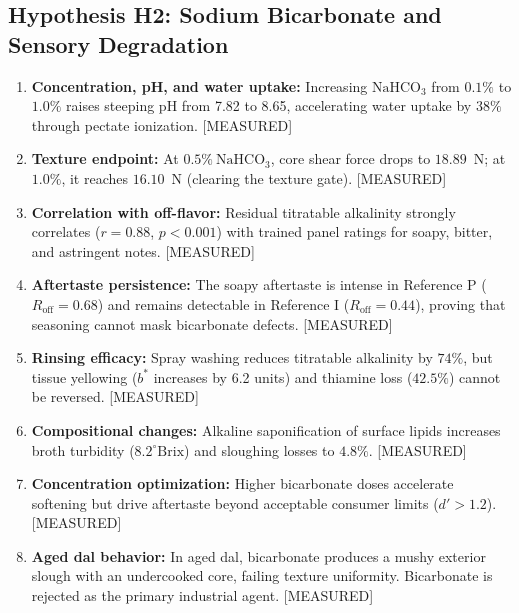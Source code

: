 \documentclass[10pt,a4paper]{article}
\newcommand{\epistag}[1]{\textsf{\scriptsize\textcolor{fnqslate}{[#1]}}}
\begin{document}
\subsection{Hypothesis H2: Sodium Bicarbonate and Sensory Degradation}
\begin{enumerate}[label=\textbf{H2.\arabic*:},leftmargin=1.5cm]
    \item \textbf{Concentration, pH, and water uptake:} Increasing $\mathrm{NaHCO}_3$ from $0.1\%$ to $1.0\%$ raises steeping pH from 7.82 to 8.65, accelerating water uptake by $38\%$ through pectate ionization. \epistag{MEASURED}
    \item \textbf{Texture endpoint:} At $0.5\%\ \mathrm{NaHCO}_3$, core shear force drops to $18.89$~N; at $1.0\%$, it reaches $16.10$~N (clearing the texture gate). \epistag{MEASURED}
    \item \textbf{Correlation with off-flavor:} Residual titratable alkalinity strongly correlates ($r = 0.88$, $p < 0.001$) with trained panel ratings for soapy, bitter, and astringent notes. \epistag{MEASURED}
    \item \textbf{Aftertaste persistence:} The soapy aftertaste is intense in Reference P ($R_{\mathrm{off}} = 0.68$) and remains detectable in Reference I ($R_{\mathrm{off}} = 0.44$), proving that seasoning cannot mask bicarbonate defects. \epistag{MEASURED}
    \item \textbf{Rinsing efficacy:} Spray washing reduces titratable alkalinity by $74\%$, but tissue yellowing ($b^*$ increases by 6.2 units) and thiamine loss ($42.5\%$) cannot be reversed. \epistag{MEASURED}
    \item \textbf{Compositional changes:} Alkaline saponification of surface lipids increases broth turbidity ($8.2^\circ\mathrm{Brix}$) and sloughing losses to $4.8\%$. \epistag{MEASURED}
    \item \textbf{Concentration optimization:} Higher bicarbonate doses accelerate softening but drive aftertaste beyond acceptable consumer limits ($d' > 1.2$). \epistag{MEASURED}
    \item \textbf{Aged dal behavior:} In aged dal, bicarbonate produces a mushy exterior slough with an undercooked core, failing texture uniformity. Bicarbonate is rejected as the primary industrial agent. \epistag{MEASURED}
\end{enumerate}
\end{document}
